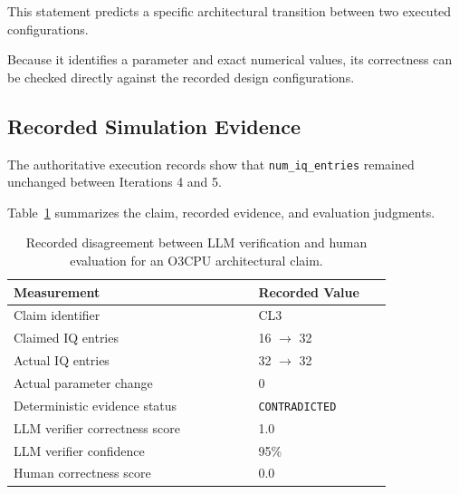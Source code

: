 This statement predicts a
specific architectural transition
between two executed configurations.

Because it identifies a parameter
and exact numerical values,
its correctness can be checked
directly against the recorded
design configurations.

\subsection{Recorded Simulation Evidence}

The authoritative execution
records show that
\texttt{num\_iq\_entries}
remained unchanged between
Iterations 4 and 5.

Table~\ref{tab:app_verifier_disagreement}
summarizes the claim,
recorded evidence,
and evaluation judgments.

\begin{table}[htbp]
\centering
\caption{Recorded disagreement between
LLM verification and human evaluation
for an O3CPU architectural claim.}
\label{tab:app_verifier_disagreement}

\renewcommand{\arraystretch}{1.2}
\small
\setlength{\tabcolsep}{5pt}

\begin{tabular}{p{0.55\linewidth}p{0.30\linewidth}}
\toprule
\textbf{Measurement} &
\textbf{Recorded Value} \\
\midrule

Claim identifier & CL3 \\

Claimed IQ entries &
16 $\rightarrow$ 32 \\

Actual IQ entries &
32 $\rightarrow$ 32 \\

Actual parameter change &
0 \\

Deterministic evidence status &
\texttt{CONTRADICTED} \\

LLM verifier correctness score &
1.0 \\

LLM verifier confidence &
95\% \\

Human correctness score &
0.0 \\

\bottomrule
\end{tabular}
\end{table}

